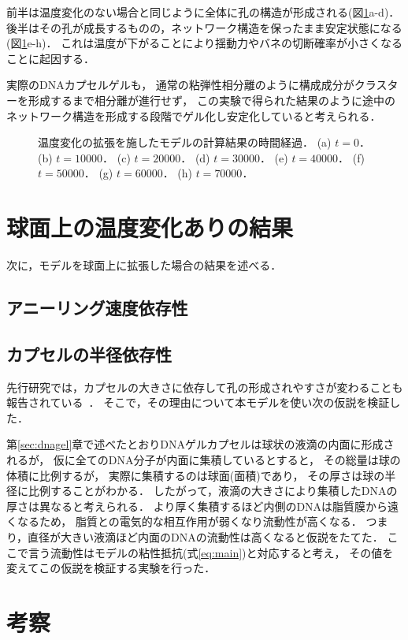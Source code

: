 前半は温度変化のない場合と同じように全体に孔の構造が形成される(図\ref{fig:result_2d_with_anearing}a-d)．
後半はその孔が成長するものの，ネットワーク構造を保ったまま安定状態になる(図\ref{fig:result_2d_with_anearing}e-h)．
これは温度が下がることにより揺動力やバネの切断確率が小さくなることに起因する．


実際のDNAカプセルゲルも，
通常の粘弾性相分離のように構成成分がクラスターを形成するまで相分離が進行せず，
この実験で得られた結果のように途中のネットワーク構造を形成する段階でゲル化し安定化していると考えられる．

\begin{figure}
\centering

\caption{
    温度変化の拡張を施したモデルの計算結果の時間経過．
    (a) $t=0$．
    (b) $t=10000$．
    (c) $t=20000$．
    (d) $t=30000$．
    (e) $t=40000$．
    (f) $t=50000$．
    (g) $t=60000$．
    (h) $t=70000$．
}
\label{fig:result_2d_with_anearing}
\end{figure}

\section{球面上の温度変化ありの結果}

次に，モデルを球面上に拡張した場合の結果を述べる．

\subsection{アニーリング速度依存性}


\subsection{カプセルの半径依存性}
先行研究では，カプセルの大きさに依存して孔の形成されやすさが変わることも報告されている~\cite{morita2017formation}．
そこで，その理由について本モデルを使い次の仮説を検証した．

第\ref{sec:dnagel}章で述べたとおりDNAゲルカプセルは球状の液滴の内面に形成されるが，
仮に全てのDNA分子が内面に集積しているとすると，
その総量は球の体積に比例するが，
実際に集積するのは球面(面積)であり，
その厚さは球の半径に比例することがわかる．
したがって，液滴の大きさにより集積したDNAの厚さは異なると考えられる．
より厚く集積するほど内側のDNAは脂質膜から遠くなるため，
脂質との電気的な相互作用が弱くなり流動性が高くなる．
つまり，直径が大きい液滴ほど内面のDNAの流動性は高くなると仮説をたてた．
ここで言う流動性はモデルの粘性抵抗(式\ref{eq:main})と対応すると考え，
その値を変えてこの仮説を検証する実験を行った．

\section{考察}
